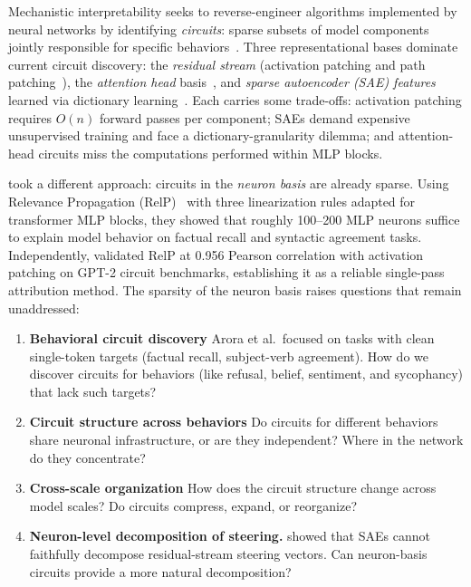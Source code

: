 \documentclass[11pt]{article}
\begin{document}
Mechanistic interpretability seeks to reverse-engineer algorithms implemented by neural networks by identifying \emph{circuits}: sparse subsets of model components jointly responsible for specific behaviors~\citep{conmy2023acdc, wang2023ioi, elhage2022toy}.
Three representational bases dominate current circuit discovery: the \emph{residual stream} (activation patching and path patching~\citep{meng2022rome, goldowskydill2023localizing}), the \emph{attention head} basis~\citep{wang2023ioi}, and \emph{sparse autoencoder (SAE) features} learned via dictionary learning~\citep{cunningham2023sae, bricken2023monosemanticity, templeton2024scaling, marks2024sparse}.
Each carries some trade-offs: activation patching requires $O(n)$ forward passes per component; SAEs demand expensive unsupervised training and face a dictionary-granularity dilemma; and attention-head circuits miss the computations performed within MLP blocks.

\citet{arora2025circuits} took a different approach: circuits in the \emph{neuron basis} are already sparse.
Using Relevance Propagation (RelP)~\citep{achtibat2024relp, bach2015pixel} with three linearization rules adapted for transformer MLP blocks, they showed that roughly 100--200 MLP neurons suffice to explain model behavior on factual recall and syntactic agreement tasks.
Independently, \citet{jafari2025relp} validated RelP at 0.956 Pearson correlation with activation patching on GPT-2 circuit benchmarks, establishing it as a reliable single-pass attribution method.
The sparsity of the neuron basis raises questions that remain unaddressed:

\begin{enumerate}[leftmargin=2em]
    \item \textbf{Behavioral circuit discovery} Arora et al.\ focused on tasks with clean single-token targets (factual recall, subject-verb agreement). How do we discover circuits for behaviors (like refusal, belief, sentiment, and sycophancy) that lack such targets?

    \item \textbf{Circuit structure across behaviors} Do circuits for different behaviors share neuronal infrastructure, or are they independent? Where in the network do they concentrate?

    \item \textbf{Cross-scale organization} How does the circuit structure change across model scales? Do circuits compress, expand, or reorganize?

    \item \textbf{Neuron-level decomposition of steering.} \citet{mayne2024sae_steering} showed that SAEs cannot faithfully decompose residual-stream steering vectors. Can neuron-basis circuits provide a more natural decomposition?
\end{enumerate}
\end{document}
